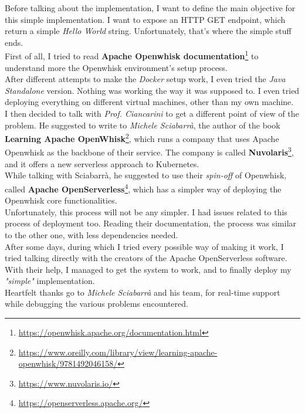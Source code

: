 Before talking about the implementation, I want to define the main objective for this simple implementation. I want to expose an HTTP GET endpoint, which return a simple \textit{Hello World} string. Unfortunately, that's where the simple stuff ends.\vspace{14pt}\\
First of all, I tried to read \textbf{Apache Openwhisk documentation}\footnote{\url{https://openwhisk.apache.org/documentation.html}} to understand more the Openwhisk environment's setup process.\\
After different attempts to make the \textit{Docker} setup work, I even tried the \textit{Java Standalone} version. Nothing was working the way it was supposed to. I even tried deploying everything on different virtual machines, other than my own machine.\vspace{14pt}\\
I then decided to talk with \textit{Prof. Ciancarini} to get a different point of view of the problem. He suggested to write to \textit{Michele Sciabarrà}, the author of the book \textbf{Learning Apache OpenWhisk}\footnote{\url{https://www.oreilly.com/library/view/learning-apache-openwhisk/9781492046158/}}, which runs a company that uses Apache Openwhisk as the backbone of their service. The company is called \textbf{Nuvolaris}\footnote{\url{https://www.nuvolaris.io/}}, and it offers a new serverless approach to Kubernetes.\\
While talking with Sciabarrà, he suggested to use their \textit{spin-off} of Openwhisk, called \textbf{Apache OpenServerless}\footnote{\url{https://openserverless.apache.org/}}, which has a simpler way of deploying the Openwhisk core functionalities.\vspace{14pt}\\
Unfortunately, this process will not be any simpler. I had issues related to this process of deployment too. Reading their documentation, the process was similar to the other one, with less dependencies needed.\\
After some days, during which I tried every possible way of making it work, I tried talking directly with the creators of the Apache OpenServerless software. With their help, I managed to get the system to work, and to finally deploy my \textit{"simple"} implementation.\vspace{14pt}\\
Heartfelt thanks go to \textit{Michele Sciabarrà} and his team, for real-time support while debugging the various problems encountered.\\
